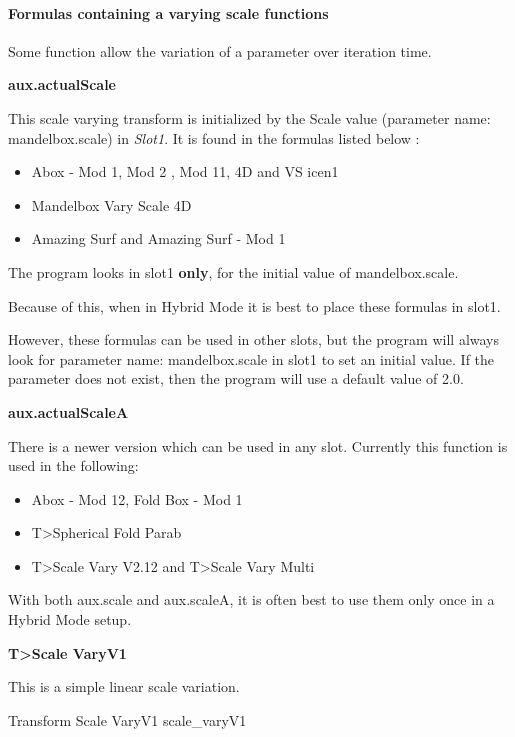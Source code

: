 \paragraph{Formulas containing a varying scale functions}

Some function allow the variation of a parameter over iteration time.


\textbf{aux.actualScale}

This scale varying transform is initialized by the Scale value (parameter name: mandelbox.scale) in \emph{Slot1}. It is found in the formulas listed below :

\begin{itemize}
	\item Abox - Mod 1, Mod 2 , Mod 11, 4D and  VS icen1
	\item Mandelbox Vary Scale 4D
	\item Amazing Surf  and Amazing Surf - Mod 1
\end{itemize}

The program looks  in slot1 \textbf{only}, for the initial value of  mandelbox.scale.

Because of this, when in Hybrid Mode it is best to place these formulas in slot1.

However, these formulas can be used in other slots, but the program will always look for parameter name: mandelbox.scale  in slot1 to set an initial value. If the parameter does not exist, then the program will use a default value of 2.0.


\textbf{aux.actualScaleA}

There is a newer version which can be used in any slot. Currently this function is used in  the following:

\begin{itemize}
	\item Abox - Mod 12, Fold Box - Mod 1
	\item T>Spherical Fold Parab
	\item T>Scale Vary V2.12 and T>Scale Vary Multi
	\end{itemize}
	
With both aux.scale and aux.scaleA, it is often best to use them only once in a Hybrid Mode setup.

\textbf{T>Scale VaryV1}

This is a simple linear scale variation.

{Transform Scale VaryV1}
{scale_varyV1}

